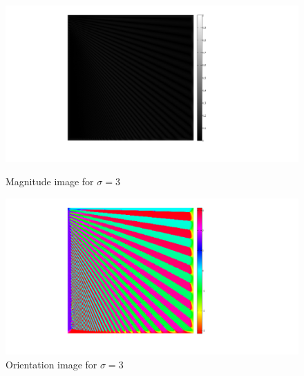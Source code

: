 \documentclass[a4paper,10pt]{article}
\begin{document}
\begin{figure}[ht]
\begin{minipage}[b]{0.45\linewidth}
\centering
\includegraphics[width=\textwidth]{pn1_img/magnitude_sigma3}
\caption{Magnitude image for $\sigma=3$}
\end{minipage}
\hspace{0.1cm}
\begin{minipage}[b]{0.45\linewidth}
\centering
\includegraphics[width=\textwidth]{pn1_img/orientation_sigma3}
\caption{Orientation image for $\sigma=3$}
\end{minipage}
\end{figure}
\end{document}
